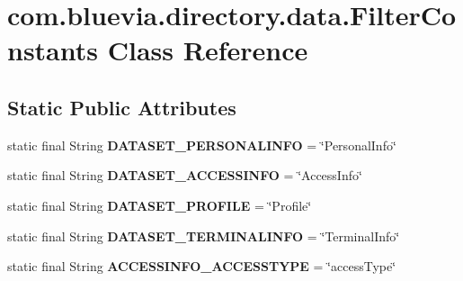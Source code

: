 \hypertarget{classcom_1_1bluevia_1_1directory_1_1data_1_1FilterConstants}{
\section{com.bluevia.directory.data.FilterConstants Class Reference}
\label{classcom_1_1bluevia_1_1directory_1_1data_1_1FilterConstants}
}
\subsection*{Static Public Attributes}
\begin{DoxyCompactItemize}
\item 
\hypertarget{classcom_1_1bluevia_1_1directory_1_1data_1_1FilterConstants_a0632fb0725628c5890f6056f8727236f}{
static final String {\bfseries DATASET\_\-PERSONALINFO} = \char`\"{}PersonalInfo\char`\"{}}
\label{classcom_1_1bluevia_1_1directory_1_1data_1_1FilterConstants_a0632fb0725628c5890f6056f8727236f}

\item 
\hypertarget{classcom_1_1bluevia_1_1directory_1_1data_1_1FilterConstants_ab308deadcaa80899689fa028e9d2c839}{
static final String {\bfseries DATASET\_\-ACCESSINFO} = \char`\"{}AccessInfo\char`\"{}}
\label{classcom_1_1bluevia_1_1directory_1_1data_1_1FilterConstants_ab308deadcaa80899689fa028e9d2c839}

\item 
\hypertarget{classcom_1_1bluevia_1_1directory_1_1data_1_1FilterConstants_a6826438dcbd40e316e2d7fdc2506d66f}{
static final String {\bfseries DATASET\_\-PROFILE} = \char`\"{}Profile\char`\"{}}
\label{classcom_1_1bluevia_1_1directory_1_1data_1_1FilterConstants_a6826438dcbd40e316e2d7fdc2506d66f}

\item 
\hypertarget{classcom_1_1bluevia_1_1directory_1_1data_1_1FilterConstants_a3ae66035e508e682d87f0718b20cf6d7}{
static final String {\bfseries DATASET\_\-TERMINALINFO} = \char`\"{}TerminalInfo\char`\"{}}
\label{classcom_1_1bluevia_1_1directory_1_1data_1_1FilterConstants_a3ae66035e508e682d87f0718b20cf6d7}

\item 
\hypertarget{classcom_1_1bluevia_1_1directory_1_1data_1_1FilterConstants_aef9f046f73a5f598a5b29e1e143acb4e}{
static final String {\bfseries ACCESSINFO\_\-ACCESSTYPE} = \char`\"{}accessType\char`\"{}}
\label{classcom_1_1bluevia_1_1directory_1_1data_1_1FilterConstants_aef9f046f73a5f598a5b29e1e143acb4e}


\end{DoxyCompactItemize}
